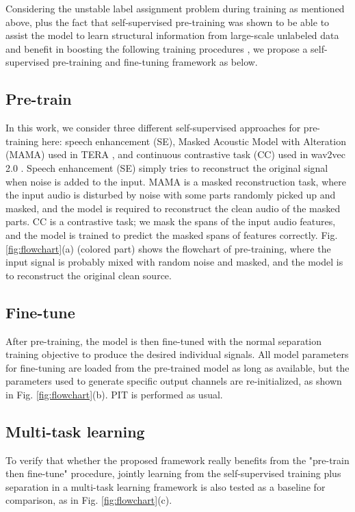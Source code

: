 \documentclass[a4paper]{article}
\begin{document}
Considering the unstable label assignment problem during training as mentioned above, plus the fact that self-supervised pre-training was shown to be able to assist the model to learn structural information from large-scale unlabeled data and benefit in boosting the following training procedures \cite{devlin2018bert,peters2018deep,radford2018improving,chen2020simple,chen2020big,oord2018representation,bachman2019learning,henaff2019data}, we propose a self-supervised pre-training and fine-tuning framework as below.

\subsection{Pre-train}
\label{ssec:pretrain}
In this work, we consider three different self-supervised approaches for pre-training here: speech enhancement (SE), Masked Acoustic Model with Alteration (MAMA) used in TERA \cite{liu2020tera}, and continuous contrastive task (CC) used in wav2vec 2.0 \cite{baevski2020wav2vec}.
Speech enhancement (SE) simply tries to  reconstruct the original signal when noise is added to the input.
MAMA is a masked reconstruction task, where the input audio is disturbed by noise with some parts randomly picked up and masked, and the model is required to reconstruct the clean audio of the masked parts.
CC is a contrastive task; we mask the spans of the input audio features, and the model is trained to predict the masked spans of features correctly.
Fig. \ref{fig:flowchart}(a) (colored part) shows the flowchart of pre-training, where the input signal is probably mixed with random noise and masked, and the model is to reconstruct the original clean source.

\subsection{Fine-tune}
\label{ssec:finetune}
After pre-training, the model is then fine-tuned with the normal separation training objective to produce the desired individual signals.
All model parameters for fine-tuning are loaded from the pre-trained model as long as available, but the parameters used to generate specific output channels are re-initialized, as shown in Fig. \ref{fig:flowchart}(b).
PIT is performed as usual.

\subsection{Multi-task learning}
\label{ssec:multi-task}
To verify that whether the proposed framework really benefits from the "pre-train then fine-tune" procedure, jointly learning from the self-supervised training plus separation in a multi-task learning framework is also tested as a baseline for comparison, as in Fig. \ref{fig:flowchart}(c). 
\end{document}
